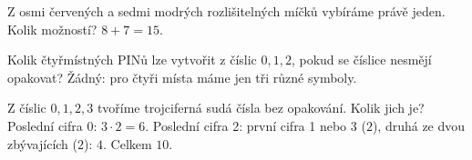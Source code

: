 \documentclass[11pt,a4paper]{article}
\begin{document}
\begin{zadaniReseniBox}[title={Samostatná práce 2}]
Z osmi červených a sedmi modrých rozlišitelných míčků vybíráme právě jeden. Kolik možností?
\tcblower
$8+7=15$.
\end{zadaniReseniBox}



\begin{zadaniReseniBox}[title={Samostatná práce 3}]
Kolik čtyřmístných PINů lze vytvořit z číslic $0,1,2$, pokud se číslice nesmějí opakovat?
\tcblower
Žádný: pro čtyři místa máme jen tři různé symboly.
\end{zadaniReseniBox}




\begin{zadaniReseniBox}[title={Rozšíření 1}]
Z číslic $0,1,2,3$ tvoříme trojciferná sudá čísla bez opakování. Kolik jich je?
\tcblower
Poslední cifra 0: $3\cdot2=6$. Poslední cifra 2: první cifra 1 nebo 3 ($2$), druhá ze dvou zbývajících ($2$): $4$. Celkem $10$.
\end{zadaniReseniBox}




\end{document}
